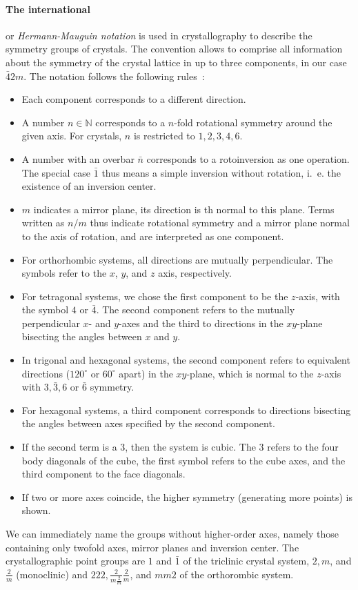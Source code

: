 \paragraph{The international} or \emph{Hermann-Mauguin notation} 
is used in crystallography to describe the symmetry groups of crystals. 
The convention allows to comprise all information about the symmetry 
of the crystal lattice in up to three components, in our case $\bar{4}2m$. 
The notation follows the following rules~\cite{sands1993introduction}:
\begin{itemize}
    \item
    Each component corresponds to a different direction. 
    \item
    A number $n \in \mathbb{N}$ corresponds to a $n$-fold rotational symmetry 
    around the given axis. For crystals, $n$ is restricted to $1, 2, 3, 4, 6$.
    \item
    A number with an overbar $\bar{n}$ corresponds 
    to a rotoinversion as one operation. The special case $\bar{1}$ thus 
    means a simple inversion without rotation, i.~e. the existence of 
    an inversion center. 
    \item
    $m$ indicates a mirror plane, its direction is th normal to this plane.
    Terms written as $n/m$ thus indicate rotational symmetry and a mirror plane 
    normal to the axis of rotation, and are interpreted as one component. 
    \item
    For orthorhombic systems, all directions are mutually perpendicular. 
    The symbols refer to the $x$, $y$, and $z$ axis, respectively.
    \item
    For tetragonal systems, we chose the first component to be the $z$-axis, 
    with the symbol $4$ or $\bar{4}$. The second component refers to the 
    mutually perpendicular $x$- and $y$-axes and the third to directions in the 
    $xy$-plane bisecting the angles between $x$ and $y$. 
    \item
    In trigonal and hexagonal systems, the second component refers to 
    equivalent directions ($120^\circ$ or $60^\circ$ apart) in the $xy$-plane, 
    which is normal to the $z$-axis with $3, \bar{3}, 6$ or $\bar{6}$ symmetry. 
    \item
    For hexagonal systems, a third component corresponds to directions bisecting 
    the angles between axes specified by the second component. 
    \item
    If the second term is a $3$, then the system is cubic. The $3$ refers to the 
    four body diagonals of the cube, the first symbol refers to the cube axes, and the 
    third component to the face diagonals.
    \item
    If two or more axes coincide, the higher symmetry (generating more points) is 
    shown. 
\end{itemize}
We can immediately name the groups without higher-order axes, namely those 
containing only twofold axes, mirror planes and inversion center. The 
crystallographic point groups are $1$ and $\bar{1}$ of the 
triclinic crystal system, $2, m$, and $\frac{2}{m}$ (monoclinic) and 
$222, \frac{2}{m\frac{2}{m}}\frac{2}{m}$, and $mm2$ of the orthorombic system. 

